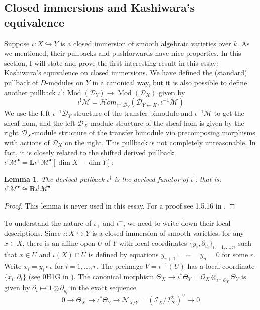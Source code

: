 \documentclass[11pt, a4paper]{article}
\newtheorem{lemma}[theorem]{Lemma}
\theoremstyle{definition}
\newcommand{\Mod}{\operatorname{Mod}}
\newcommand{\dL}{\mathbf{L}}
\newcommand{\dR}{\mathbf{R}}
\begin{document}
    \subsection{Closed immersions and Kashiwara's equivalence}
    Suppose $\iota:X\hookrightarrow Y$ is a closed immersion of smooth algebraic varieties over $k$. As we mentioned, their pullbacks and pushforwards have nice properties. In this section, I will state and prove the first interesting result in this essay: Kashiwara's equivalence on closed immersions. We have defined the (standard) pullback of $D$-modules on $Y$ in a canonical way, but it is also possible to define another pullback $\iota^!:\Mod(\mathcal D_Y)\to\Mod(\mathcal D_X)$ given by
    \[\iota^!\mathcal M=\mathcal Hom_{\iota^{-1}\mathcal D_Y}(\mathcal D_{Y\leftarrow X}, \iota^{-1}\mathcal M)\]
    We use the left $\iota^{-1}\mathcal D_Y$ structure of the transfer bimodule and $\iota^{-1}\mathcal M$ to get the sheaf hom, and the left $\mathcal D_X$-module structure of the sheaf hom is given by the right $\mathcal D_X$-module structure of the transfer bimodule via precomposing morphisms with actions of $\mathcal D_X$ on the right. This pullback is not completely unreasonable. In fact, it is closely related to the shifted derived pullback $\iota^\dagger\mathcal M^\bullet=\dL\iota^+\mathcal M^\bullet[\dim X-\dim Y]$:
    \begin{lemma}
        The derived pullback $\iota^\dagger$ is the derived functor of $\iota^!$, that is, $\iota^\dagger\mathcal M^\bullet\cong \dR\iota^!\mathcal M^\bullet$.
    \end{lemma}
    \begin{proof}
        This lemma is never used in this essay. For a proof see 1.5.16 in \cite{htt-d-modules}.
    \end{proof}
    To understand the nature of $\iota_+$ and $\iota^+$, we need to write down their local descriptions. Since $\iota:X\hookrightarrow Y$ is a closed immersion of smooth varieties, for any $x\in X$, there is an affine open $U$ of $Y$ with local coordinates $\{y_i,\partial_{y_i}\}_{i=1,\dots, n}$ such that $x\in U$ and $\iota(X)\cap U$ is defined by equations $y_{r+1}=\cdots=y_n=0$ for some $r$. Write $x_i=y_i\circ\iota$ for $i=1,\dots, r$. The preimage $V=\iota^{-1}(U)$ has a local coordinate $\{x_i,\partial_{i}\}$ (see 0H1G in \cite{stacks-project}). The canonical morphism $\Theta_X\to\iota^*\Theta_Y=\mathcal O_X\otimes_{\iota^{-1}\mathcal O_Y}\Theta_Y$ is given by $\partial_i\mapsto1\otimes\partial_{y_i}$ in the exact sequence 
    \[0\to\Theta_X\to\iota^*\Theta_Y\to\mathcal N_{X/Y}=(\mathcal I_X/\mathcal I_X^2)^\vee\to 0\] 
\end{document}
